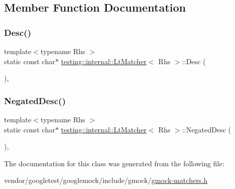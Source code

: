 \subsection{Member Function Documentation}
\mbox{\label{classtesting_1_1internal_1_1_lt_matcher_aeb101aafbf1c074ccbb3df1496487746}} 
\subsubsection{\texorpdfstring{Desc()}{Desc()}}
{\footnotesize\ttfamily template$<$typename Rhs $>$ \\
static const char$\ast$ \hyperlink{classtesting_1_1internal_1_1_lt_matcher}{testing\+::internal\+::\+Lt\+Matcher}$<$ Rhs $>$\+::Desc (\begin{DoxyParamCaption}{ }\end{DoxyParamCaption})\hspace{0.3cm}{\ttfamily [inline]}, {\ttfamily [static]}}

\mbox{\label{classtesting_1_1internal_1_1_lt_matcher_ab62db503e9e0293b4a2d22a96c140b10}} 
\subsubsection{\texorpdfstring{Negated\+Desc()}{NegatedDesc()}}
{\footnotesize\ttfamily template$<$typename Rhs $>$ \\
static const char$\ast$ \hyperlink{classtesting_1_1internal_1_1_lt_matcher}{testing\+::internal\+::\+Lt\+Matcher}$<$ Rhs $>$\+::Negated\+Desc (\begin{DoxyParamCaption}{ }\end{DoxyParamCaption})\hspace{0.3cm}{\ttfamily [inline]}, {\ttfamily [static]}}



The documentation for this class was generated from the following file\+:\begin{DoxyCompactItemize}
\item 
vendor/googletest/googlemock/include/gmock/\hyperlink{gmock-matchers_8h}{gmock-\/matchers.\+h}\end{DoxyCompactItemize}
